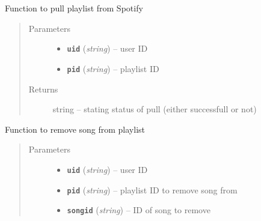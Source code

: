 \documentclass[letterpaper,10pt,english]{sphinxmanual}
\begin{document}
\begin{fulllineitems}
\begin{fulllineitems}
\end{fulllineitems}


\begin{fulllineitems}
\label{index:gitsound.SpotifyUser.pull_spotify_playlist}
Function to pull playlist from Spotify
\begin{quote}\begin{description}
\item[{Parameters}] \leavevmode\begin{itemize}
\item {} 
\textbf{\texttt{uid}} (\emph{string}) -- user ID

\item {} 
\textbf{\texttt{pid}} (\emph{string}) -- playlist ID

\end{itemize}

\item[{Returns}] \leavevmode
string -- stating status of pull (either successfull or not)

\end{description}\end{quote}

\end{fulllineitems}


\begin{fulllineitems}
\label{index:gitsound.SpotifyUser.remove_song_from_playlist}
Function to remove song from playlist
\begin{quote}\begin{description}
\item[{Parameters}] \leavevmode\begin{itemize}
\item {} 
\textbf{\texttt{uid}} (\emph{string}) -- user ID

\item {} 
\textbf{\texttt{pid}} (\emph{string}) -- playlist ID to remove song from

\item {} 
\textbf{\texttt{songid}} (\emph{string}) -- ID of song to remove

\end{itemize}


\end{description}
\end{quote}
\end{fulllineitems}
\end{fulllineitems}
\end{document}
